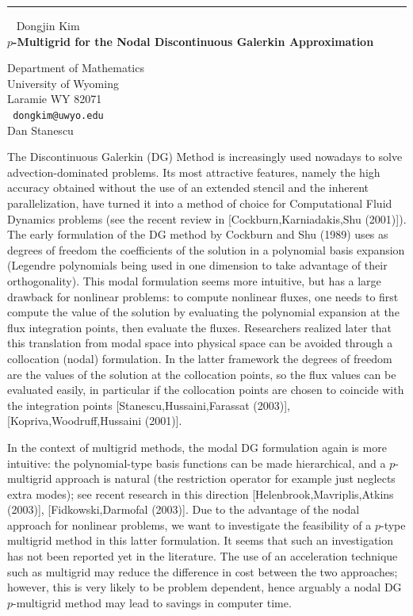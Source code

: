 \documentclass{report}
\begin{document}
\begin{center}

\rule{6in}{1pt} \
{\large
Dongjin Kim
\\ {\bf
$p$-Multigrid for the Nodal Discontinuous Galerkin Approximation
}}


Department of Mathematics \\
University of Wyoming \\
Laramie WY 82071
\\ {\tt
dongkim@uwyo.edu
}
\\
Dan Stanescu
\end{center}



The Discontinuous Galerkin (DG) Method is increasingly used nowadays to
solve advection-dominated problems. Its most attractive features,
namely the high accuracy obtained without the use of an extended
stencil and the inherent parallelization, have turned it into a method
of choice for Computational Fluid Dynamics problems (see the recent
review in [Cockburn,Karniadakis,Shu (2001)]). The early formulation of
the DG method by Cockburn and Shu (1989) uses as degrees of freedom the
coefficients of the solution in a polynomial basis expansion (Legendre
polynomials being used in one dimension to take advantage of their
orthogonality). This modal formulation seems more intuitive, but has a
large drawback for nonlinear problems: to compute nonlinear fluxes, one
needs to first compute the value of the solution by evaluating the
polynomial expansion at the flux integration points, then evaluate the
fluxes. Researchers realized later that this translation from modal
space into physical space can be avoided through a collocation (nodal)
formulation. In the latter framework the degrees of freedom are the
values of the solution at the collocation points, so the flux values
can be evaluated easily, in particular if the collocation points are
chosen to coincide with the integration points
[Stanescu,Hussaini,Farassat (2003)], [Kopriva,Woodruff,Hussaini
(2001)].

In the context of multigrid methods, the modal DG formulation again is
more intuitive: the polynomial-type basis functions can be made
hierarchical, and a $p$-multigrid approach is natural (the restriction
operator for example just neglects extra modes); see recent research in
this direction [Helenbrook,Mavriplis,Atkins (2003)],
[Fidkowski,Darmofal (2003)]. Due to the advantage of the nodal approach
for nonlinear problems, we want to investigate the feasibility of a
$p$-type multigrid method in this latter formulation. It seems that such
an investigation has not been reported yet in the literature. The use
of an acceleration technique such as multigrid may reduce the
difference in cost between the two approaches; however, this is very
likely to be problem dependent, hence arguably a nodal DG $p$-multigrid
method may lead to savings in computer time.
\end{document}
